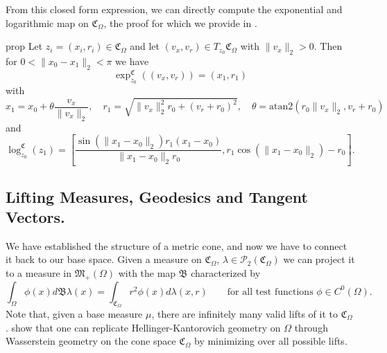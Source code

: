 \documentclass[11pt]{article}
\begin{document}
From this closed form expression, we can directly compute the exponential and logarithmic map on $\mathfrak{C}_\Omega$, the proof for which we provide in .
\begin{restatable}{prop}{} \label{cone exponential and log map}
    Let $z_i = (x_i, r_i) \in \mathfrak{C}_{\Omega}$ and let $(v_x, v_r) \in T_{z_0}\mathfrak{C}_\Omega$ with $\|v_x\|_2 > 0$. Then for $0 < \|x_0 - x_1\|_2 < \pi$ we have
    \begin{equation} \label{eq: cone exp map}
        \exp^{\mathfrak{C}}_{z_0}((v_x, v_r)) = \left(x_1, r_1\right)
    \end{equation}
    with 
    \begin{equation*}
        x_1 = x_0 + \theta\frac{v_x}{\|v_x\|_2}, \quad r_1 = \sqrt{\|v_x\|_2^2r_0 + (v_r+r_0)^2}, \quad \theta = \text{atan2}(r_0\|v_x\|_2, v_r + r_0)
    \end{equation*}
    and 
    \begin{equation} \label{eq: cone log map}
        \log_{z_0}^\mathfrak{C}(z_1) = \left[\frac{\sin(\|x_1 - x_0\|_2)r_1(x_1 - x_0)}{\|x_1 - x_0\|_2r_0}, r_1\cos(\|x_1 - x_0\|_2) - r_0\right].
    \end{equation}
\end{restatable} 

\subsection{Lifting Measures, Geodesics and Tangent Vectors.}
We have established the structure of a metric cone, and now we have to connect it back to our base space. Given a measure on $\mathfrak{C}_\Omega$, $\lambda \in \mathcal{P}_2(\mathfrak{C}_{\Omega})$ we can project it to a measure in $\mathfrak{M}_+(\Omega)$ with the map $\mathfrak{B}$ characterized by
\begin{equation} \label{eq: measure projection}
    \int_{\Omega} \phi(x)d\mathfrak{B}\lambda(x) = \int_{\mathfrak{C}_\Omega} r^2 \phi(x) d\lambda(x, r) \qquad \text{for all test functions }\phi \in C^0(\Omega).
\end{equation}
Note that, given a base measure $\mu$, there are infinitely many valid lifts of it to $\mathfrak{C}_\Omega$. \citet{liero2016optimal} show that one can replicate Hellinger-Kantorovich geometry on $\Omega$ through Wasserstein geometry on the cone space $\mathfrak{C}_\Omega$ by minimizing over all possible lifts. 
\end{document}
